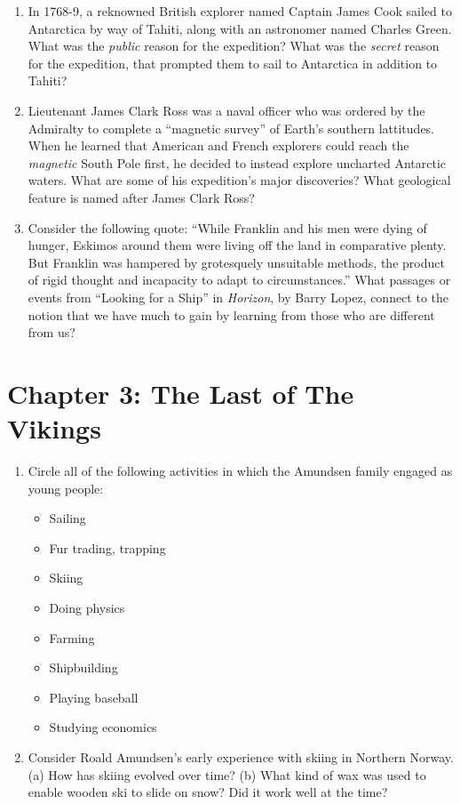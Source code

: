 \documentclass{article}
\begin{document}
\begin{enumerate}
\item In 1768-9, a reknowned British explorer named Captain James Cook sailed to Antarctica by way of Tahiti, along with an astronomer named Charles Green.  What was the \textit{public} reason for the expedition?  What was the \textit{secret} reason for the expedition, that prompted them to sail to Antarctica in addition to Tahiti? \\ \vspace{3cm}
\item Lieutenant James Clark Ross was a naval officer who was ordered by the Admiralty to complete a ``magnetic survey'' of Earth's southern lattitudes.  When he learned that American and French explorers could reach the \textit{magnetic} South Pole first, he decided to instead explore uncharted Antarctic waters.  What are some of his expedition's major discoveries?  What geological feature is named after James Clark Ross?  \\ \vspace{3cm}
\item Consider the following quote: ``While Franklin and his men were dying of hunger, Eskimos around them were living off the land in comparative plenty.  But Franklin was hampered by grotesquely unsuitable methods, the product of rigid thought and incapacity to adapt to circumstances.''  What passages or events from ``Looking for a Ship'' in \textit{Horizon}, by Barry Lopez, connect to the notion that we have much to gain by learning from those who are different from us? \\ \vspace{5cm}
\end{enumerate}

\section{Chapter 3: The Last of The Vikings}
\begin{enumerate}
\item Circle all of the following activities in which the Amundsen family engaged as young people:
\begin{itemize}
\item Sailing
\item Fur trading, trapping
\item Skiing
\item Doing physics
\item Farming
\item Shipbuilding
\item Playing baseball
\item Studying economics
\end{itemize}
\item Consider Roald Amundsen's early experience with skiing in Northern Norway.  (a) How has skiing evolved over time? (b) What kind of wax was used to enable wooden ski to slide on snow?  Did it work well at the time? \\ \vspace{3cm}
\end{enumerate}
\end{document}
